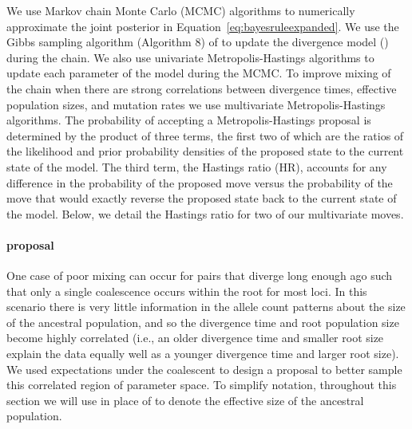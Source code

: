 We use Markov chain Monte Carlo (MCMC) algorithms to numerically approximate
the joint posterior in Equation~\ref{eq:bayesruleexpanded}.
We use the Gibbs sampling algorithm (Algorithm 8) of \citet{Neal2000}
to update the divergence model (\divtimemodel) during the chain.
We also use univariate Metropolis-Hastings algorithms
\citep{Metropolis1953,Hastings1970} to update each parameter of the model
during the MCMC.
To improve mixing of the chain when there are strong correlations between
divergence times, effective population sizes, and mutation rates we use
multivariate Metropolis-Hastings algorithms.
The probability of accepting a Metropolis-Hastings proposal is determined
by the product of three terms, the first two of which are the
ratios of the likelihood and prior probability densities of the proposed
state to the current state of the model.
The third term, the Hastings ratio (HR), accounts for any difference in the
probability of the proposed move versus the probability of the move that
would exactly reverse the proposed state back to the current state of the
model.
Below, we detail the Hastings ratio for two of our multivariate moves.

\paragraph{\timerootsizemixer proposal}
One case of poor mixing can occur for pairs that diverge long enough ago such
that only a single coalescence occurs within the root for most loci.
In this scenario there is very little information in the allele count patterns
about the size of the ancestral population, and so the divergence time and root
population size become highly correlated (i.e., an older divergence time and
smaller root size explain the data equally well as a younger divergence time
and larger root size).
We used expectations under the coalescent to design a proposal to better sample
this correlated region of parameter space.
To simplify notation, throughout this section we will use
\sepopsize[\rootpopindex] in place of \epopsize[\rootpopindex] to denote the
effective size of the ancestral population.

